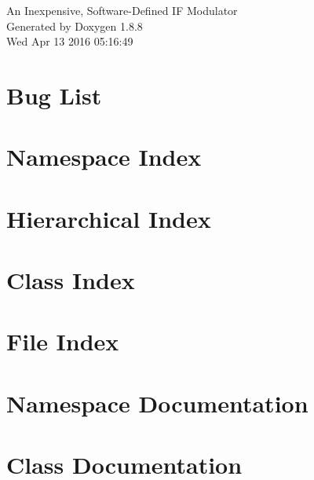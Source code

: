 \documentclass[twoside]{book}
\newcommand{\+}{\discretionary{\mbox{\scriptsize$\hookleftarrow$}}{}{}}
\newcommand{\clearemptydoublepage}{%
  \newpage{\pagestyle{empty}\cleardoublepage}%
}
\begin{document}
\hypersetup{pageanchor=false,
             bookmarks=true,
             bookmarksnumbered=true,
             pdfencoding=unicode
            }
\begin{titlepage}
\vspace*{7cm}
\begin{center}%
{\Large An Inexpensive, Software-\/\+Defined I\+F Modulator }\\
\vspace*{1cm}
{\large Generated by Doxygen 1.8.8}\\
\vspace*{0.5cm}
{\small Wed Apr 13 2016 05:16:49}\\
\end{center}
\end{titlepage}
\clearemptydoublepage
\tableofcontents
\clearemptydoublepage
{}
\hypersetup{pageanchor=true}

\chapter{Bug List}
\label{bug}
\hypertarget{bug}{}

\chapter{Namespace Index}

\chapter{Hierarchical Index}

\chapter{Class Index}

\chapter{File Index}

\chapter{Namespace Documentation}

\chapter{Class Documentation}





\end{document}
